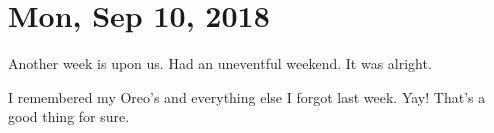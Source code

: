 \section{Mon, Sep 10, 2018}

Another week is upon us. Had an uneventful weekend. It was alright.

I remembered my Oreo's and everything else I forgot last week. Yay! That's a good
thing for sure.